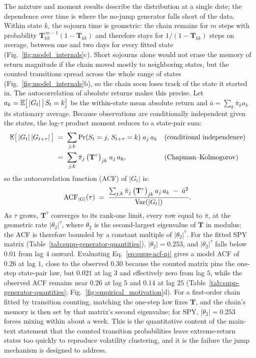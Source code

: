 The mixture and moment results describe the distribution at a single
date; the dependence over time is where the no-jump generator falls
short of the data. Within state $k$, the sojourn time is geometric:
the chain remains for $m$ steps with probability
$\mathbf{T}_{kk}^{\,m-1} (1 - \mathbf{T}_{kk})$ and therefore stays
for $1/(1 - \mathbf{T}_{kk})$ steps on average, between one and two
days for every fitted state
(Fig.~\ref{fig:model_internals}c). Short sojourns alone would not
erase the memory of return magnitude if the chain moved mostly to
neighboring states, but the counted transitions spread across the
whole range of states (Fig.~\ref{fig:model_internals}b), so the chain
soon loses track of the state it started in. The autocorrelation of
absolute returns makes this precise. Let $a_k =
\mathbb{E}\big[\,|G_t| \,\big|\, S_t = k\big]$ be the within-state mean
absolute return and $\bar a = \sum_k \bar\pi_k a_k$ its stationary
average. Because observations are conditionally independent given the
states, the lag-$\tau$ product moment reduces to a state-pair sum:
\begin{align}
  \mathbb{E}\big[\,|G_t|\, |G_{t+\tau}|\,\big]
   &\;=\; \sum_{j, k}
     \Pr(S_t = j,\, S_{t+\tau} = k)\; a_j\, a_k
     && \text{(conditional independence)} \notag \\
   &\;=\; \sum_{j, k} \bar\pi_j\,
     \big(\mathbf{T}^\tau\big)_{jk}\; a_j\, a_k,
     && \text{(Chapman--Kolmogorov)}
  \label{eq:supp-acf-nj}
\end{align}
so the autocorrelation function (ACF) of $|G_t|$ is:
\begin{equation}
  \mathrm{ACF}_{|G|}(\tau)
  \;=\; \frac{\sum_{j, k} \bar\pi_j\,
    \big(\mathbf{T}^\tau\big)_{jk}\, a_j\, a_k \;-\; \bar a^2}
    {\operatorname{Var}(|G_t|)}.
  \label{eq:supp-acf-nj-def}
\end{equation}
As $\tau$ grows, $\mathbf{T}^\tau$ converges
to its rank-one limit, every row equal to $\bar\pi$, at the geometric
rate $|\theta_2|^\tau$, where $\theta_2$ is the second-largest
eigenvalue of $\mathbf{T}$ in modulus; the ACF is therefore bounded
by a constant multiple of $|\theta_2|^\tau$. For the fitted SPY
matrix (Table~\ref{tab:supp-generator-quantities}), $|\theta_2| = 0.253$, and $|\theta_2|^\tau$ falls below
$0.01$ from lag $4$ onward. Evaluating Eq.~\eqref{eq:supp-acf-nj}
gives a model ACF of $0.26$ at lag $1$, close to the observed $0.30$
because the counted matrix pins the one-step state-pair law, but
$0.021$ at lag $3$ and effectively zero from lag $5$, while the
observed ACF remains near $0.26$ at lag $5$ and $0.14$ at lag $25$
(Table~\ref{tab:supp-generator-quantities};
Fig.~\ref{fig:empirical_motivation}d). For a first-order chain fitted
by transition counting, matching the one-step law fixes $\mathbf{T}$,
and the chain's memory is then set by that matrix's second
eigenvalue; for SPY, $|\theta_2| = 0.253$ forces mixing within about
a week. This is the quantitative content of the main-text statement
that the counted transition probabilities leave extreme-return states
too quickly to reproduce volatility clustering, and it is the failure
the jump mechanism is designed to address.

